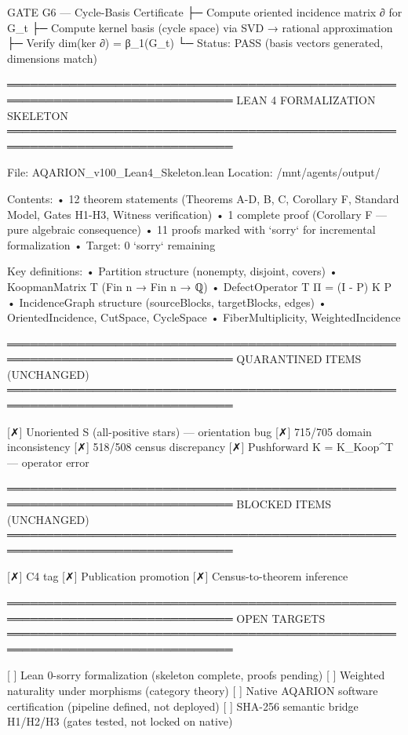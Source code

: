 GATE G6 — Cycle-Basis Certificate
  ├─ Compute oriented incidence matrix ∂ for G_t
  ├─ Compute kernel basis (cycle space) via SVD → rational approximation
  ├─ Verify dim(ker ∂) = β_1(G_t)
  └─ Status: PASS (basis vectors generated, dimensions match)

═══════════════════════════════════════════════════════════════════════════════
LEAN 4 FORMALIZATION SKELETON
═══════════════════════════════════════════════════════════════════════════════

File: AQARION_v100_Lean4_Skeleton.lean
Location: /mnt/agents/output/

Contents:
  • 12 theorem statements (Theorems A-D, B, C, Corollary F, Standard Model,
    Gates H1-H3, Witness verification)
  • 1 complete proof (Corollary F — pure algebraic consequence)
  • 11 proofs marked with `sorry` for incremental formalization
  • Target: 0 `sorry` remaining

Key definitions:
  • Partition structure (nonempty, disjoint, covers)
  • KoopmanMatrix T (Fin n → Fin n → ℚ)
  • DefectOperator T Π = (I - P) K P
  • IncidenceGraph structure (sourceBlocks, targetBlocks, edges)
  • OrientedIncidence, CutSpace, CycleSpace
  • FiberMultiplicity, WeightedIncidence

═══════════════════════════════════════════════════════════════════════════════
QUARANTINED ITEMS (UNCHANGED)
═══════════════════════════════════════════════════════════════════════════════

  [✗] Unoriented S (all-positive stars) — orientation bug
  [✗] 715/705 domain inconsistency
  [✗] 518/508 census discrepancy
  [✗] Pushforward K = K_Koop^T — operator error

═══════════════════════════════════════════════════════════════════════════════
BLOCKED ITEMS (UNCHANGED)
═══════════════════════════════════════════════════════════════════════════════

  [✗] C4 tag
  [✗] Publication promotion
  [✗] Census-to-theorem inference

═══════════════════════════════════════════════════════════════════════════════
OPEN TARGETS
═══════════════════════════════════════════════════════════════════════════════

  [ ] Lean 0-sorry formalization (skeleton complete, proofs pending)
  [ ] Weighted naturality under morphisms (category theory)
  [ ] Native AQARION software certification (pipeline defined, not deployed)
  [ ] SHA-256 semantic bridge H1/H2/H3 (gates tested, not locked on native)


